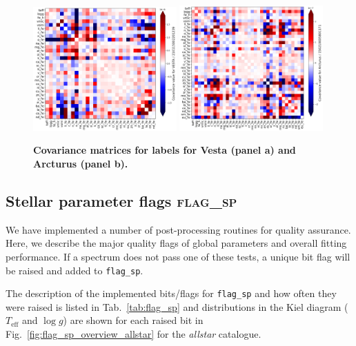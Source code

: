 \documentclass[
  journal=pasa,
  manuscript=research-paper, %
  year=2023,
  volume=37
]{cup-journal}
\newcommand{\Teff}{$T_\mathrm{eff}$\xspace}
\newcommand{\logg}{$\log g$\xspace}
\begin{document}
\begin{figure}[ht]
 \centering
 \includegraphics[width=0.49\textwidth]{figures/covariance_vesta.png}
 \hfill
 \includegraphics[width=0.49\textwidth]{figures/covariance_arcturus.png}
 \caption{\textbf{Covariance matrices for labels for Vesta (panel a) and Arcturus (panel b).}}
 \label{fig:covariance_vesta_arcturus}
\end{figure}


\subsection{Stellar parameter flags \textsc{flag\_sp}}
\label{sec:flag_sp}

We have implemented a number of post-processing routines for quality assurance. Here, we describe the major quality flags of global parameters and overall fitting performance. If a spectrum does not pass one of these tests, a unique bit flag will be raised and added to \texttt{flag\_sp}.

The description of the implemented bits/flags for \texttt{flag\_sp} and how often they were raised is listed in Tab.~\ref{tab:flag_sp} and distributions in the Kiel diagram (\Teff and \logg) are shown for each raised bit in Fig.~\ref{fig:flag_sp_overview_allstar} for the \textit{allstar} catalogue.
\end{document}
